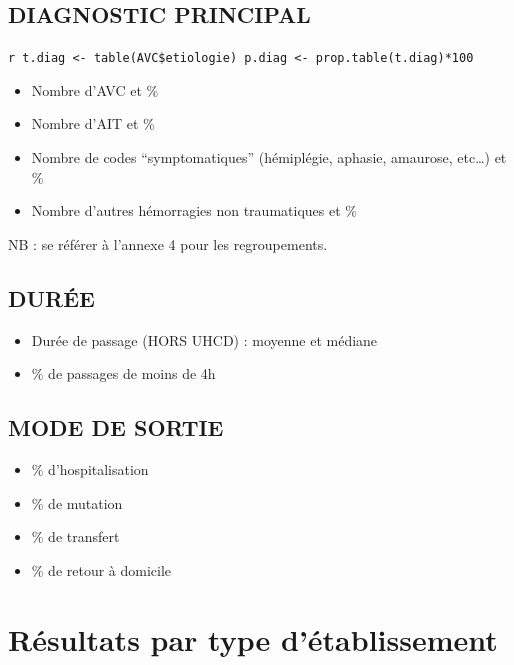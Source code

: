 \documentclass[]{article}
\begin{document}
\subsection{DIAGNOSTIC PRINCIPAL}\label{diagnostic-principal}

\texttt{r   t.diag \textless{}- table(AVC\$etiologie)   p.diag \textless{}- prop.table(t.diag)*100}

\begin{itemize}
\itemsep1pt\parskip0pt
\item
  Nombre d'AVC et \%
\item
  Nombre d'AIT et \%
\item
  Nombre de codes ``symptomatiques'' (hémiplégie, aphasie, amaurose,
  etc\ldots{}) et \%
\item
  Nombre d'autres hémorragies non traumatiques et \%
\end{itemize}

NB : se référer à l'annexe 4 pour les regroupements.

\subsection{DURÉE}\label{duree}

\begin{itemize}
\itemsep1pt\parskip0pt
\item
  Durée de passage (HORS UHCD) : moyenne et médiane
\item
  \% de passages de moins de 4h
\end{itemize}

\subsection{MODE DE SORTIE}\label{mode-de-sortie}

\begin{itemize}
\itemsep1pt\parskip0pt
\item
  \% d'hospitalisation
\item
  \% de mutation
\item
  \% de transfert
\item
  \% de retour à domicile
\end{itemize}

\section{Résultats par type
d'établissement}\label{resultats-par-type-detablissement}
\end{document}
